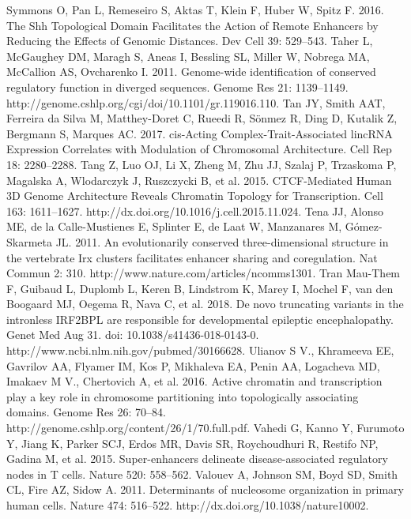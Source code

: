 \begin{thebibliography}{1}
	 Symmons O, Pan L, Remeseiro S, Aktas T, Klein F, Huber W, Spitz F. 2016. The Shh Topological Domain Facilitates the Action of Remote Enhancers by Reducing the Effects of Genomic Distances. Dev Cell 39: 529–543.
	 Taher L, McGaughey DM, Maragh S, Aneas I, Bessling SL, Miller W, Nobrega MA, McCallion AS, Ovcharenko I. 2011. Genome-wide identification of conserved regulatory function in diverged sequences. Genome Res 21: 1139–1149. http://genome.cshlp.org/cgi/doi/10.1101/gr.119016.110.
	 Tan JY, Smith AAT, Ferreira da Silva M, Matthey-Doret C, Rueedi R, Sönmez R, Ding D, Kutalik Z, Bergmann S, Marques AC. 2017. cis-Acting Complex-Trait-Associated lincRNA Expression Correlates with Modulation of Chromosomal Architecture. Cell Rep 18: 2280–2288.
	 Tang Z, Luo OJ, Li X, Zheng M, Zhu JJ, Szalaj P, Trzaskoma P, Magalska A, Wlodarczyk J, Ruszczycki B, et al. 2015. CTCF-Mediated Human 3D Genome Architecture Reveals Chromatin Topology for Transcription. Cell 163: 1611–1627. http://dx.doi.org/10.1016/j.cell.2015.11.024.
	 Tena JJ, Alonso ME, de la Calle-Mustienes E, Splinter E, de Laat W, Manzanares M, Gómez-Skarmeta JL. 2011. An evolutionarily conserved three-dimensional structure in the vertebrate Irx clusters facilitates enhancer sharing and coregulation. Nat Commun 2: 310. http://www.nature.com/articles/ncomms1301.
	 Tran Mau-Them F, Guibaud L, Duplomb L, Keren B, Lindstrom K, Marey I, Mochel F, van den Boogaard MJ, Oegema R, Nava C, et al. 2018. De novo truncating variants in the intronless IRF2BPL are responsible for developmental epileptic encephalopathy. Genet Med Aug 31. doi: 10.1038/s41436-018-0143-0. http://www.ncbi.nlm.nih.gov/pubmed/30166628.
	 Ulianov S V., Khrameeva EE, Gavrilov AA, Flyamer IM, Kos P, Mikhaleva EA, Penin AA, Logacheva MD, Imakaev M V., Chertovich A, et al. 2016. Active chromatin and transcription play a key role in chromosome partitioning into topologically associating domains. Genome Res 26: 70–84. http://genome.cshlp.org/content/26/1/70.full.pdf.
	 Vahedi G, Kanno Y, Furumoto Y, Jiang K, Parker SCJ, Erdos MR, Davis SR, Roychoudhuri R, Restifo NP, Gadina M, et al. 2015. Super-enhancers delineate disease-associated regulatory nodes in T cells. Nature 520: 558–562.
	 Valouev A, Johnson SM, Boyd SD, Smith CL, Fire AZ, Sidow A. 2011. Determinants of nucleosome organization in primary human cells. Nature 474: 516–522. http://dx.doi.org/10.1038/nature10002.

\end{thebibliography}
